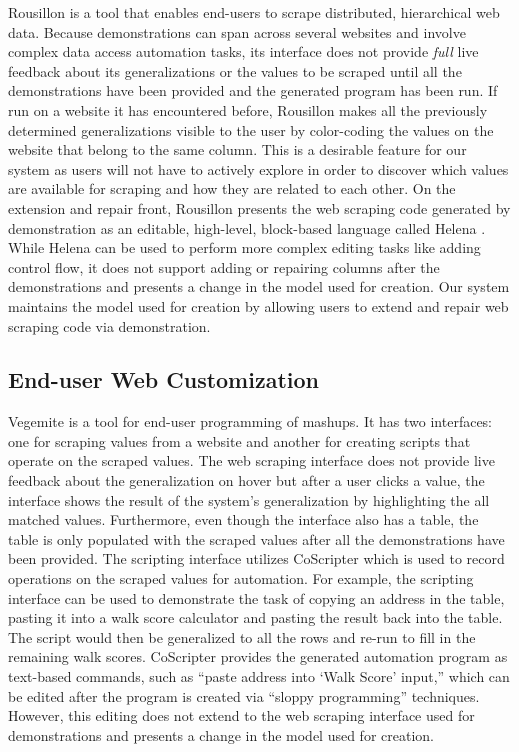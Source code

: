 \documentclass[sigconf,10pt]{acmart}
\begin{document}
Rousillon \citep{chasins2018} is a tool that enables end-users to scrape
distributed, hierarchical web data. Because demonstrations can span
across several websites and involve complex data access automation
tasks, its interface does not provide \emph{full} live feedback about
its generalizations or the values to be scraped until all the
demonstrations have been provided and the generated program has been
run. If run on a website it has encountered before, Rousillon makes all
the previously determined generalizations visible to the user by
color-coding the values on the website that belong to the same column.
This is a desirable feature for our system as users will not have to
actively explore in order to discover which values are available for
scraping and how they are related to each other. On the extension and
repair front, Rousillon presents the web scraping code generated by
demonstration as an editable, high-level, block-based language called
Helena \citep{zotero-1349}. While Helena can be used to perform more
complex editing tasks like adding control flow, it does not support
adding or repairing columns after the demonstrations and presents a
change in the model used for creation. Our system maintains the model
used for creation by allowing users to extend and repair web scraping
code via demonstration.

\hypertarget{end-user-web-customization}{%
\subsection{End-user Web
Customization}\label{end-user-web-customization}}

Vegemite \citep{lin2009} is a tool for end-user programming of mashups.
It has two interfaces: one for scraping values from a website and
another for creating scripts that operate on the scraped values. The web
scraping interface does not provide live feedback about the
generalization on hover but after a user clicks a value, the interface
shows the result of the system's generalization by highlighting the all
matched values. Furthermore, even though the interface also has a table,
the table is only populated with the scraped values after all the
demonstrations have been provided. The scripting interface utilizes
CoScripter \citep{leshed2008} which is used to record operations on the
scraped values for automation. For example, the scripting interface can
be used to demonstrate the task of copying an address in the table,
pasting it into a walk score calculator and pasting the result back into
the table. The script would then be generalized to all the rows and
re-run to fill in the remaining walk scores. CoScripter provides the
generated automation program as text-based commands, such as ``paste
address into `Walk Score' input,'' which can be edited after the program
is created via ``sloppy programming'' \citep{lin2009} techniques.
However, this editing does not extend to the web scraping interface used
for demonstrations and presents a change in the model used for creation.
\end{document}
